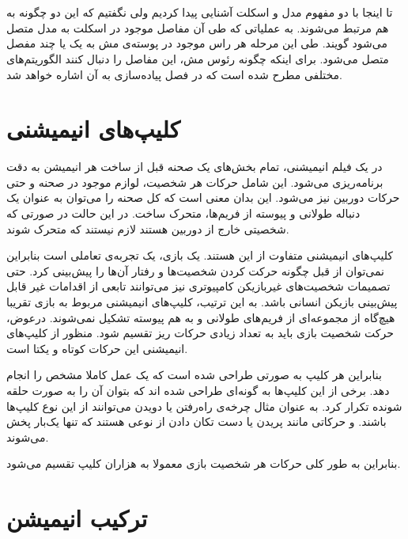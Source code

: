 \section{
}

تا اینجا با دو مفهوم مدل و اسکلت آشنایی پیدا کردیم ولی نگفتیم که این دو چگونه به هم مرتبط می‌شوند.
به عملیاتی که طی آن مفاصل موجود در اسکلت به مدل متصل می‌شود 
گویند.
طی این مرحله هر راس موجود در پوسته‌ی مش به یک یا چند مفصل متصل می‌شود.
برای اینکه چگونه رئوس مش، این مفاصل را دنبال کنند الگوریتم‌های مختلفی مطرح شده است که در فصل پیاده‌سازی به آن اشاره ‌خواهد شد.

\section{‌کلیپ‌های انیمیشنی}

در یک فیلم انیمیشنی، تمام بخش‌های یک صحنه قبل از ساخت هر انیمیشن به دقت برنامه‌ریزی می‌شود.
این شامل حرکات هر شخصیت، لوازم موجود در صحنه و حتی حرکات دوربین نیز می‌شود.
این بدان معنی است که کل صحنه را می‌توان به عنوان یک دنباله طولانی و پیوسته از فریم‌ها، متحرک ساخت.
در این حالت در صورتی که شخصیتی خارج از دوربین هستند لازم نیستند که متحرک شوند.

کلیپ‌های انیمیشنی متفاوت از این هستند. یک بازی، یک تجربه‌ی تعاملی است بنابراین نمی‌توان از قبل چگونه حرکت کردن شخصیت‌ها و رفتار آن‌ها را پیش‌بینی کرد.
حتی تصمیمات شخصیت‌های غیربازیکن کامپیوتری نیز می‌توانند تابعی از اقدامات غیر قابل پیش‌بینی بازیکن انسانی باشد.
به این ترتیب، کلیپ‌های انیمیشنی مربوط به بازی تقریبا هیچ‌گاه از مجموعه‌ای از فریم‌های طولانی و به هم پیوسته تشکیل نمی‌شوند.
درعوض، حرکت شخصیت بازی باید به تعداد زیادی حرکات ریز تقسیم شود. 
منظور از کلیپ‌های انیمیشنی این حرکات کوتاه و یکتا است.

بنابراین هر کلیپ به صورتی طراحی شده است که یک عمل کاملا مشخص را انجام دهد. برخی از این کلیپ‌ها به گونه‌ای طراحی شده اند که بتوان آن را به صورت حلقه شونده تکرار کرد.
به عنوان مثال چرخه‌ی راه‌رفتن یا دویدن می‌توانند از این نوع کلیپ‌ها باشند.
و حرکاتی مانند پریدن یا دست تکان دادن از نوعی هستند که تنها یک‌بار پخش می‌شوند.

بنابراین به طور کلی حرکات هر شخصیت بازی معمولا به هزاران کلیپ تقسیم می‌شود. \cite{GameEngineArchitecture}

\section{ترکیب انیمیشن}

